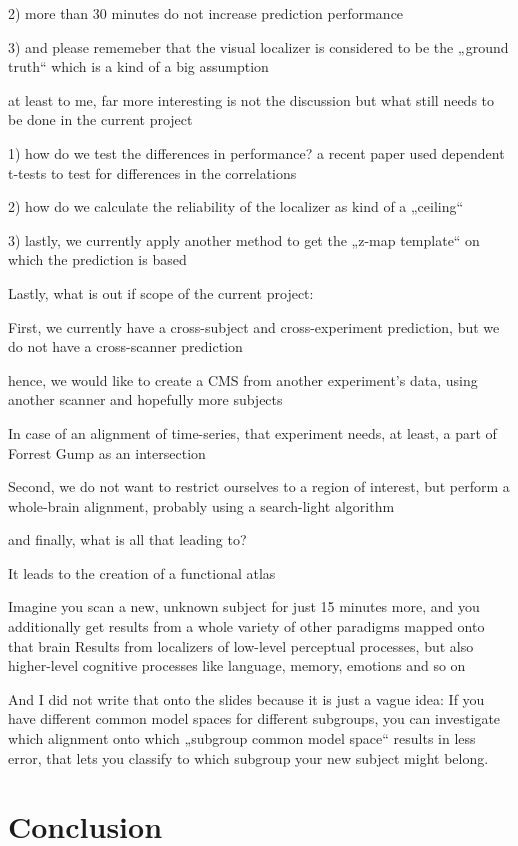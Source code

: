 2) more than 30 minutes do not increase prediction performance

3) and please rememeber that the visual localizer is considered to be the „ground truth“ which is a kind of a big assumption

at least to me, far more interesting is not the discussion
but what still needs to be done in the current project

1) how do we test the differences in performance?
a recent paper used dependent t-tests
to test for differences in the correlations

2) how do we calculate the reliability of the localizer as kind of a „ceiling“

3) lastly, we currently apply another method to get the „z-map template“
    on which the prediction is based

Lastly, what is out if scope of the current project:

First,
we currently have a cross-subject and cross-experiment prediction,
but we do not have a cross-scanner prediction

hence, we would like to create a CMS from another experiment’s data,
using another scanner and hopefully more subjects

In case of an alignment of time-series,
that experiment needs, at least, a part of Forrest Gump as an intersection

Second,
we do not want to restrict ourselves to a region of interest,
but perform a whole-brain alignment,
probably using a search-light algorithm

and finally,
what is all that leading to?

It leads to the creation of a functional atlas

Imagine you scan a new, unknown subject for just 15 minutes more, and you additionally get results from a whole variety of other paradigms mapped onto that brain
Results from localizers of low-level perceptual processes, but also higher-level cognitive processes like language, memory, emotions and so on

And I did not write that onto the slides because it is just a vague idea:
If you have different common model spaces for different subgroups,
you can investigate which alignment
onto which „subgroup common model space“
results in less error,
that lets you classify to which subgroup your new subject might belong.


\section{Conclusion}

